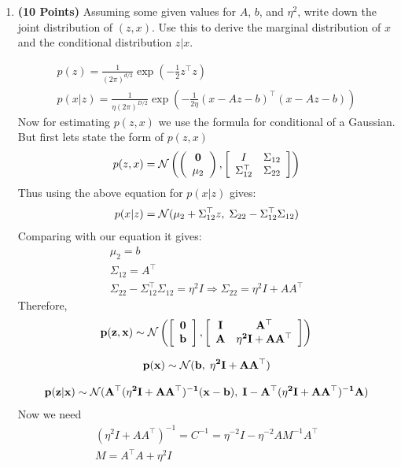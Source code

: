 \begin{enumerate}
\item \textbf{(10 Points)}
Assuming some given values for $A$, $b$, and $\eta^2$, write down the joint distribution of $(z,x)$. Use this to derive the marginal
distribution of $x$ and the conditional distribution $z|x$.

\begin{soln}
    \begin{gather*}
        p(z) = \frac{1}{{(2\pi)}^{d/2}}\exp{\left(-\frac{1}{2}z^\top z\right)} \\
        p(x|z) = \frac{1}{\eta{(2\pi)}^{D/2}}\exp{\left(-\frac{1}{2\eta}(x-Az-b)^\top(x-Az-b)\right)}
    \end{gather*}
    Now for estimating $p(z,x)$ we use the formula for conditional of a Gaussian.
    But first lets state the form of $p(z,x)$
    $$
        p(z,x) = \mathcal{N} \left( \left(\begin{array}{c} \mathbf{0} \\ \mu_2 \end{array} \right), \left[ \begin{array}{cc} I & \Sigma_{12} \\ \Sigma_{12}^\top & \Sigma_{22} \end{array} \right] \right)
    $$
    Thus using the above equation for $p(x|z)$ gives:
    $$
        p(x|z) = \mathcal{N}(\mu_2+ \Sigma_{12}^\top z, \;\Sigma_{22} - \Sigma_{12}^\top\Sigma_{12} )
    $$
    Comparing with our equation it gives:
    \begin{gather*}
        \mu_2 = b \\
        \Sigma_{12} = A^\top \\
        \Sigma_{22} - \Sigma_{12}^\top\Sigma_{12} = \eta^2I \Rightarrow \Sigma_{22} = \eta^2I + AA^\top
    \end{gather*}
    Therefore,
    $$
        \mathbf{p(z,x) \sim \mathcal{N} \left( \left[\begin{array}{c} \mathbf{0} \\ \mathbf{b} \end{array} \right], \left[ \begin{array}{cc} \mathbf{I} & \mathbf{A^\top} \\ \mathbf{A} & \mathbf{\eta^2I + AA^\top} \end{array} \right] \right)}
    $$
    
    $$
        \mathbf{p(x)} \sim \mathcal{N}(\mathbf{b}, \; \mathbf{\eta^2I + AA^\top}) 
    $$
    
    $$
        \mathbf{p(z|x)} \sim \mathcal{N}(\mathbf{A^\top(\eta^2I+AA^\top)^{-1}(x-b)}, \; \mathbf{I - A^\top(\eta^2I+AA^\top)^{-1}A})
    $$
    Now we need 
    \begin{gather*}
        (\eta^2I+AA^\top)^{-1} = C^{-1} = \eta^{-2}I - \eta^{-2}AM^{-1}A^\top \\
        M = A^\top A + \eta^2I
    \end{gather*}


\end{soln}
\end{enumerate}
